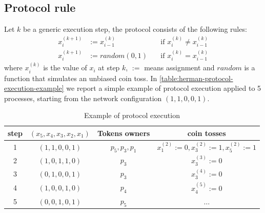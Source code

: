 \subsection{Protocol rule}

Let $k$ be a generic execution step, the protocol consists of the
following rules:
\begin{displaymath}
  \begin{split}
    x_{i}^{(k+1)} &:= x_{i-1}^{(k)} \quad &\text{if } x_{i}^{(k)} \not=
    x_{i-1}^{(k)}\\
    x_{i}^{(k+1)} &:= random(0,1) \quad &\text{if } x_{i}^{(k)} =
    x_{i-1}^{(k)}
  \end{split}
\end{displaymath}
where $x_{i}^{(k)}$ is the value of $x_i$ at step $k$, $:=$ means
assignment and $random$ is a function that simulates an unbiased coin
toss. In \autoref{table:herman-protocol-execution-example} we report a
simple example of protocol execution applied to 5 processes, starting
from the network configuration $(1, 1, 0, 0, 1)$.
\begin{table}[ht]
  \begin{center}
    \begin{tabular}{cccc}
      \hline
      step & $(x_5, x_4, x_3, x_2, x_1)$ & Tokens owners & coin tosses \\ 
      \hline     
      1 & $(1, 1, 0, 0, 1)$ & $p_5, p_3, p_1$ & $x_1^{(2)}:= 0,
      x_3^{(2)}:= 1, x_5^{(2)}:= 1$  \\
      2 & $(1, 0, 1, 1, 0)$ & $p_3$ & $x_3^{(3)}:= 0$  \\
      3 & $(0, 1, 0, 0, 1)$ & $p_3$ & $x_3^{(4)}:= 0$  \\
      4 & $(1, 0, 0, 1, 0)$ & $p_4$ & $x_4^{(5)}:= 0$  \\
      5 & $(0, 0, 1, 0, 1)$ & $p_5$ & $\ldots$  \\ 
      \hline
    \end{tabular}
    \caption{Example of protocol execution}
    \label{table:herman-protocol-execution-example}
  \end{center}
\end{table}

